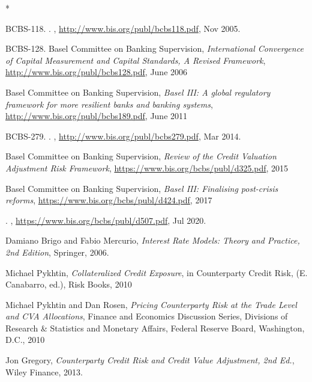 \begin{thebibliography}{*}

BCBS-118.
.
,
  \url{http://www.bis.org/publ/bcbs118.pdf}, {Nov} 2005.

  BCBS-128.
  Basel Committee on Banking Supervision, {\em International Convergence of Capital Measurement and
    Capital Standards, A Revised Framework}, \url{http://www.bis.org/publ/bcbs128.pdf}, June 2006

 Basel Committee on Banking Supervision, {\em Basel III: A global regulatory framework for more
    resilient banks and banking systems}, \url{http://www.bis.org/publ/bcbs189.pdf}, June 2011

BCBS-279.
.
,
  \url{http://www.bis.org/publ/bcbs279.pdf}, {Mar} 2014.

  Basel Committee on Banking Supervision, {\em Review of the Credit Valuation Adjustment Risk Framework},
  \url{https://www.bis.org/bcbs/publ/d325.pdf}, 2015

  Basel Committee on Banking Supervision, {\em Basel III: Finalising post-crisis reforms},
  \url{https://www.bis.org/bcbs/publ/d424.pdf}, 2017

.
,
  \url{https://www.bis.org/bcbs/publ/d507.pdf}, {Jul} 2020.

 Damiano Brigo and Fabio Mercurio, {\em Interest Rate Models: Theory and Practice, 2nd Edition},
  Springer, 2006.

 Michael Pykhtin, {\em Collateralized Credit Exposure}, in Counterparty Credit Risk, (E. Canabarro,
  ed.), Risk Books, 2010

 Michael Pykhtin and Dan Rosen, {\em Pricing Counterparty Risk at the Trade Level and CVA
    Allocations}, Finance and Economics Discussion Series, Divisions of Research \& Statistics and Monetary Affairs,
  Federal Reserve Board, Washington, D.C., 2010

 Jon Gregory, {\em Counterparty Credit Risk and Credit Value Adjustment, 2nd Ed.}, Wiley Finance,
  2013.


\end{thebibliography}
